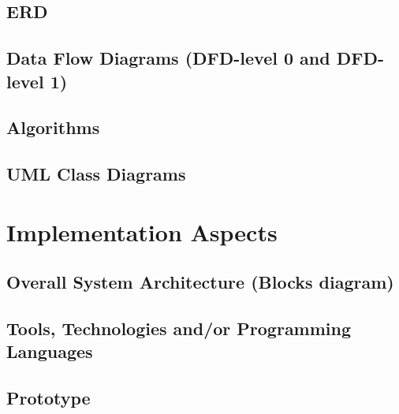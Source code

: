 \documentclass{article}
\begin{document}
                \subsection{ERD}

                \subsection{Data Flow Diagrams (DFD-level 0 and DFD-level 1)}

                \subsection{Algorithms}

                \subsection{UML Class Diagrams}

        \section{Implementation Aspects}
                \subsection{Overall System Architecture (Blocks diagram)}

                \subsection{Tools, Technologies and/or Programming Languages}

                \subsection{Prototype}
\end{document}
